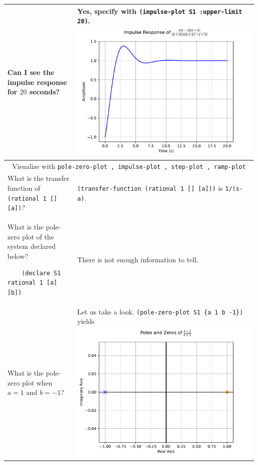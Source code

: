 \documentclass[11pt,letter]{article}
\begin{document}
\begin{longtable}{ p{} p{} }
  Can I see the impulse response for $20$ seconds?
  &
  Yes, specify with \lstinline!(impulse-plot S1 :upper-limit 20)!.
  \includegraphics[width=\linewidth]{figs/impulse-feedback-2} \\

  \midrule

  \multicolumn{2}{c}{\Large Visualize with \lstinline!pole-zero-plot , impulse-plot , step-plot , ramp-plot!} \\

  \midrule

  What is the transfer function of \lstinline!(rational 1 [] [a])!?
  &
  \lstinline!(transfer-function (rational 1 [] [a]))! is \lstinline!1/(s-a)!. \\

  What is the pole-zero plot of the system declared below?
  \begin{lstlisting}
    (declare S1 rational 1 [a] [b])
  \end{lstlisting}
  &
  There is not enough information to tell. \\

  What is the pole-zero plot when $a=1$ and $b=-1$?
  &
  Let us take a look. \lstinline!(pole-zero-plot S1 {a 1 b -1})! yields
  \includegraphics[width=\linewidth]{figs/pz-bind} \\


\end{longtable}
\end{document}
